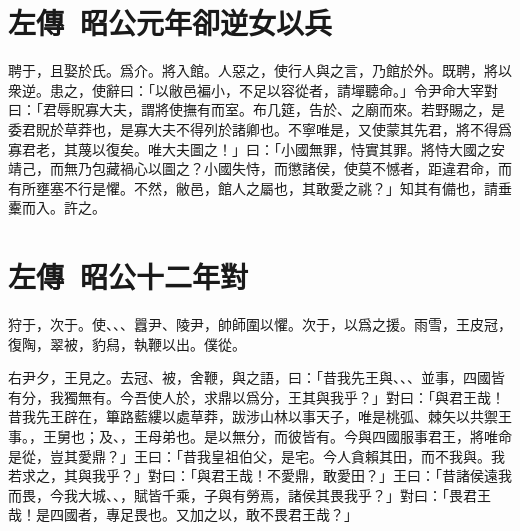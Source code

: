 \section[子產卻楚逆女以兵\quad{\small 左傳 昭公元年}]{{\normalsize 左傳\ 昭公元年}\quad {}卻逆女以兵}
聘于，且娶於氏。爲介。將入館。人惡之，使行人與之言，乃館於外。既聘，將以衆逆。患之，使辭曰：「以敝邑褊小，不足以容從者，請墠聽命。」令尹命{大}宰對曰：「君辱貺寡大夫，謂將使撫有而室。布几筵，告於、之廟而來。若野賜之，是委君貺於草莽也，是寡大夫不得列於諸卿也。不寧唯是，又使蒙其先君，將不得爲寡君老，其蔑以復矣。唯大夫圖之！」曰：「小國無罪，恃實其罪。將恃大國之安靖己，而無乃包藏禍心以圖之？小國失恃，而懲諸侯，使莫不憾者，距違君命，而有所壅塞不行是懼。不然，敝邑，館人之屬也，其敢愛之祧？」知其有備也，請垂櫜而入。許之。

\section[子革對靈王\quad{\small 左傳 昭公十二年}]{{\normalsize 左傳\ 昭公十二年}\quad {}對}
狩于，次于。使、、、囂尹、陵尹，帥師圍以懼。次于，以爲之援。雨雪，王皮冠，復陶，翠被，豹舄，執鞭以出。僕從。

右尹夕，王見之。去冠、被，舍鞭，與之語，曰：「昔我先王與、、、並事，四國皆有分，我獨無有。今吾使人於，求鼎以爲分，王其與我乎？」對曰：「與君王哉！昔我先王辟在，篳路藍縷以處草莽，跋涉山林以事天子，唯是桃弧、棘矢以共禦王事。，王舅也；及、，王母弟也。是以無分，而彼皆有。今與四國服事君王，將唯命是從，豈其愛鼎？」王曰：「昔我皇祖伯父，是宅。今人貪賴其田，而不我與。我若求之，其與我乎？」對曰：「與君王哉！不愛鼎，敢愛田？」王曰：「昔諸侯遠我而畏，今我大城、、，賦皆千乘，子與有勞焉，諸侯其畏我乎？」對曰：「畏君王哉！是四國者，專足畏也。又加之以，敢不畏君王哉？」

